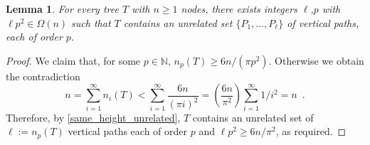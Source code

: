 \documentclass[kpfonts,lotsofwhite]{patmorin}
\newcommand{\N}{\mathbb{N}}
\renewcommand{\ge}{\geqslant}
\renewcommand{\le}{\leqslant}
\newcommand{\pat}[1]{\textcolor{Maroon}{PM: #1}}
\theoremstyle{plain}
\newtheorem{lem}[thm]{Lemma}
\theoremstyle{definition}
\begin{document}
\begin{lem}\label{newer_subdivided_star_minor}\label{subdivided_star}
  For every tree $T$ with $n \ge 1$ nodes, there exists integers $\ell$,$p$ with $\ell p^2 \in \Omega(n)$ such that $T$ contains an unrelated set $\{P_1,\ldots,P_\ell\}$ of vertical paths, each of order $p$.
\end{lem}

\begin{proof}
  We claim that, for some $p\in\N$, $n_p(T)\ge 6n/(\pi p^2)$. Otherwise we obtain the contradiction
  \[
    n = \sum_{i=1}^\infty n_i(T) < \sum_{i=1}^\infty \frac{6n}{(\pi i)^2} = \left(\frac{6n}{\pi^2}\right)\sum_{i=1}^\infty 1/i^2 = n \enspace .
  \]
  Therefore, by \cref{same_height_unrelated}, $T$ contains an unrelated set of $\ell:= n_p(T)$ vertical paths each of order $p$ and $\ell p^2\ge 6n/\pi^2$, as required.
%
%
%
%
%
%
\end{proof}
\end{document}
